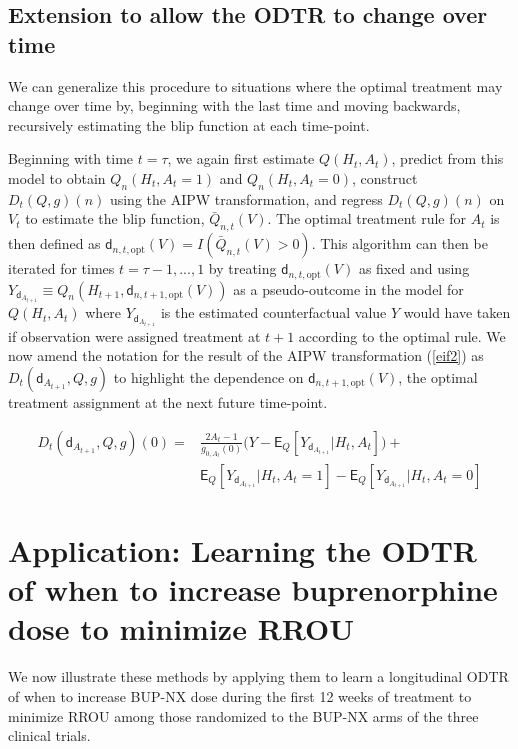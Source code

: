 \documentclass[11pt]{article}
\renewcommand{\d}{\mathsf{d}}
\newcommand{\E}{\mathsf{E}}
\begin{document}
\subsection{Extension to allow the ODTR to change over time}

We can generalize this procedure to situations where the optimal treatment may change over time by, beginning with the last time and moving backwards, recursively estimating the blip function at each time-point. 

Beginning with time $t = \tau$, we again first estimate $Q(H_t, A_t)$, predict from this model to obtain $Q_n(H_t, A_t = 1)$ and $Q_n(H_t, A_t = 0)$, construct $D_t(Q, g)(n)$ using the AIPW transformation, and regress $D_t(Q, g)(n)$ on $V_t$ to estimate the blip function, $\bar{Q}_{n,t}(V)$. The optimal treatment rule for $A_t$ is then defined as $\d_{n, t, \text{opt}}(V) = I(\bar{Q}_{n,t}(V) > 0)$. This algorithm can then be iterated for times $t = \tau - 1, ..., 1$ by treating $\d_{n, t, \text{opt}}(V)$ as fixed and using $Y_{\d_{A_{t+1}}} \equiv Q_n(H_{t+1}, \d_{n, t+1, \text{opt}}(V))$ as a pseudo-outcome in the model for $Q(H_t, A_t)$ where $Y_{\d_{A_{t+1}}}$ is the estimated counterfactual value $Y$ would have taken if observation were assigned treatment at $t + 1$ according to the optimal rule. We now amend the notation for the result of the AIPW transformation (\ref{eif2}) as $D_t(\d_{A_{t+1}}, Q, g)$ to highlight the dependence on $\d_{n,t+1, \text{opt}}(V)$, the optimal treatment assignment at the next future time-point.

\begin{equation}\label{eif2}
    \begin{split}
    D_t(\d_{A_{t+1}}, Q, g)(0) = &\frac{2A_t - 1}{g_{0, A_t}(0)}\Big(Y - \E_Q[Y_{\d_{A_{t+1}}}|H_t, A_t]\Big) + \\
    &\E_Q[Y_{\d_{A_{t+1}}}|H_t, A_t = 1] - \E_Q[Y_{\d_{A_{t+1}}}|H_t, A_t = 0]
\end{split}
\end{equation}

\section{Application: Learning the ODTR of when to increase buprenorphine dose to minimize RROU}

We now illustrate these methods by applying them to learn a longitudinal ODTR of when to increase BUP-NX dose during the first 12 weeks of treatment to minimize RROU among those randomized to the BUP-NX arms of the three clinical trials. 
\end{document}
